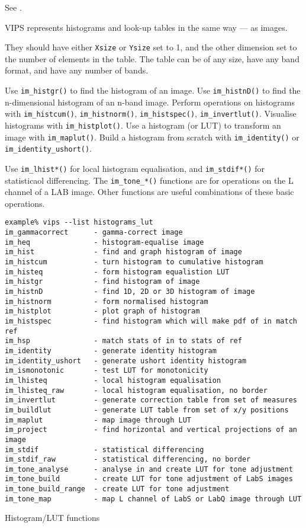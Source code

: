 See .

VIPS represents histograms and look-up tables in the same way --- as images.

They should have either \verb+Xsize+ or \verb+Ysize+ set to 1, and the
other dimension set to the number of elements in the table. The table can be
of any size, have any band format, and have any number of bands.

Use \verb+im_histgr()+ to find the histogram of an image.  Use
\verb+im_histnD()+ to find the n-dimensional histogram of an n-band
image.  Perform operations on histograms with \verb+im_histcum()+,
\verb+im_histnorm()+, \verb+im_histspec()+, \verb+im_invertlut()+. Visualise
histograms with \verb+im_histplot()+. Use a histogram (or LUT) to transform
an image with \verb+im_maplut()+. Build a histogram from scratch with
\verb+im_identity()+ or \verb+im_identity_ushort()+.

Use \verb+im_lhist*()+ for local histogram equalisation, and
\verb+im_stdif*()+ for statisticaol differencing. The \verb+im_tone_*()+
functions are for operations on the L channel of a LAB image. Other
functions are useful combinations of these basic operations.

\begin{fig2}
\begin{verbatim}
example% vips --list histograms_lut
im_gammacorrect      - gamma-correct image
im_heq               - histogram-equalise image
im_hist              - find and graph histogram of image
im_histcum           - turn histogram to cumulative histogram
im_histeq            - form histogram equalistion LUT
im_histgr            - find histogram of image
im_histnD            - find 1D, 2D or 3D histogram of image
im_histnorm          - form normalised histogram
im_histplot          - plot graph of histogram
im_histspec          - find histogram which will make pdf of in match ref
im_hsp               - match stats of in to stats of ref
im_identity          - generate identity histogram
im_identity_ushort   - generate ushort identity histogram
im_ismonotonic       - test LUT for monotonicity
im_lhisteq           - local histogram equalisation
im_lhisteq_raw       - local histogram equalisation, no border
im_invertlut         - generate correction table from set of measures
im_buildlut          - generate LUT table from set of x/y positions
im_maplut            - map image through LUT
im_project           - find horizontal and vertical projections of an image
im_stdif             - statistical differencing
im_stdif_raw         - statistical differencing, no border
im_tone_analyse      - analyse in and create LUT for tone adjustment
im_tone_build        - create LUT for tone adjustment of LabS images
im_tone_build_range  - create LUT for tone adjustment
im_tone_map          - map L channel of LabS or LabQ image through LUT
\end{verbatim}
\caption{Histogram/LUT functions}
\label{fg:hist}
\end{fig2}
  
